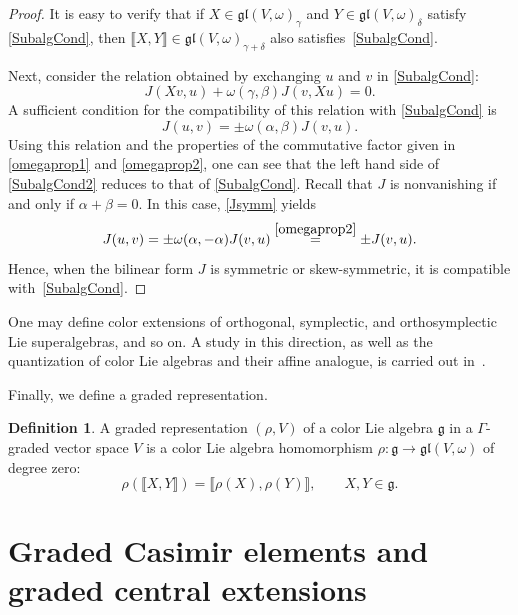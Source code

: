 \documentclass[10pt,a4paper]{amsart}
\numberwithin{equation}{section}
\theoremstyle{definition}
\newtheorem{Definition}[Theorem]{Definition}
\def\g{\mathfrak{g}}
\def\gl{\mathfrak{gl}}
\begin{document}
\begin{proof}
	It is easy to verify that if $ X \in \gl(V,\omega)_{\gamma} $ and $ Y \in \gl(V,\omega)_{\delta}$ satisfy \eqref{SubalgCond}, then $ \llbracket X, Y \rrbracket \in \gl(V,\omega)_{\gamma+\delta}$ also satisfies~\eqref{SubalgCond}.
	
	Next, consider the relation obtained by exchanging $ u $ and $ v $ in \eqref{SubalgCond}:
	\begin{equation}
		J(Xv,u) + \omega(\gamma,\beta) J(v, Xu) = 0. \label{SubalgCond2}
	\end{equation}
	A sufficient condition for the compatibility of this relation with \eqref{SubalgCond} is
	\begin{equation}
		J(u,v) = \pm \omega(\alpha,\beta) J(v,u). \label{Jsymm}
	\end{equation}
	Using this relation and the properties of the commutative factor given in \eqref{omegaprop1} and \eqref{omegaprop2}, one can see that the left hand side of \eqref{SubalgCond2} reduces to that of \eqref{SubalgCond}.
	Recall that $ J$ is nonvanishing if and only if $ \alpha + \beta = 0.$
	In this case, \eqref{Jsymm} yields
	\begin{equation*}
		J(u,v) = \pm \omega(\alpha,-\alpha) J(v,u) \stackrel{\eqref{omegaprop2}}{=} \pm J(v,u).
	\end{equation*}
Hence, when the bilinear form $J$ is symmetric or skew-symmetric, it is compatible with~\eqref{SubalgCond}.
\end{proof}

One may define color extensions of orthogonal, symplectic, and orthosymplectic Lie superalgebras, and so on.
A study in this direction, as well as the quantization of color Lie algebras and their affine analogue, is carried out in~\cite{zhang2026}.

Finally, we define a graded representation.

\begin{Definition}
	A graded representation $(\rho,V) $ of a color Lie algebra $\g$ in a $\Gamma$-graded vector space $V$ is a color Lie algebra homomorphism $ \rho\colon \g \to \gl(V,\omega)$ of degree zero:
	\begin{equation*}
		\rho(\llbracket X, Y \rrbracket) = \llbracket \rho(X), \rho(Y) \rrbracket,
		\qquad X, Y \in \g.
	\end{equation*}
\end{Definition}


\section{Graded Casimir elements and graded central extensions} \label{SEC:Method}
\end{document}
